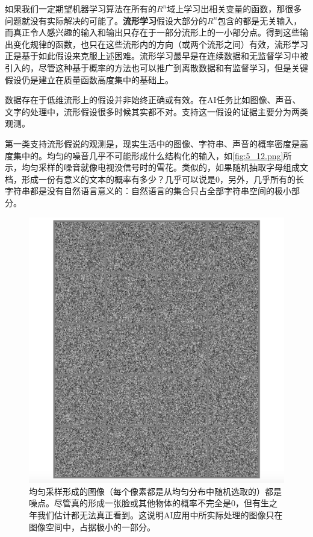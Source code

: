 如果我们一定期望机器学习算法在所有的$R^n$域上学习出相关变量的函数，那很多问题就没有实际解决的可能了。\textbf{流形学习}假设大部分的$R^n$包含的都是无关输入，而真正令人感兴趣的输入和输出只存在于一部分流形上的一小部分点。得到这些输出变化规律的函数，也只在这些流形内的方向（或两个流形之间）有效，流形学习正是基于如此假设来克服上述困难。流形学习最早是在连续数据和无监督学习中被引入的，尽管这种基于概率的方法也可以推广到离散数据和有监督学习，但是关键假设仍是建立在质量函数高度集中的基础上。

数据存在于低维流形上的假设并非始终正确或有效。在AI任务比如图像、声音、文字的处理中，流形假设很多时候其实都不对。支持这一假设的证据主要分为两类观测。

第一类支持流形假说的观测是，现实生活中的图像、字符串、声音的概率密度是高度集中的。均匀的噪音几乎不可能形成什么结构化的输入，如\ref{fig:5_12.png}所示，均匀采样的噪音就像电视没信号时的雪花。类似的，如果随机抽取字母组成文档，形成一份有意义的文本的概率有多少？几乎可以说是0，另外，几乎所有的长字符串都是没有自然语言意义的：自然语言的集合只占全部字符串空间的极小部分。


\begin{figure}[htbp]
   \centering
   \includegraphics[width=6in]{fig/chap5/5_12.png} 
   \caption{均匀采样形成的图像（每个像素都是从均匀分布中随机选取的）都是噪点。尽管真的形成一张脸或其他物体的概率不完全是0，但有生之年我们估计都无法真正看到。这说明AI应用中所实际处理的图像只在图像空间中，占据极小的一部分。}
   \label{fig:5_12}
\end{figure}

